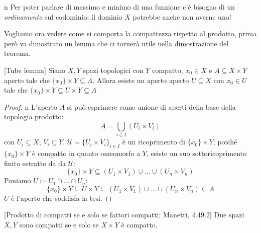 \begin{warning}{n}
	Per poter parlare di massimo e minimo di una funzione c'è bisogno di un \textit{ordinamento} sul codominio; il dominio $X$ potrebbe anche non averne uno!
\end{warning}
Vogliamo ora vedere come si comporta la compattezza rispetto al prodotto, prima però va dimostrato un lemma che ci tornerà utile nella dimostrazione del teorema.
\begin{lemma}{}[Tube lemma]\label{tube lemma}
Siano $X,Y$ spazi topologici con $Y$ compatto, $x_0\in X$ e $A\subseteq X\times Y$ aperto tale che $\{x_0\}\times Y\subseteq A$. Allora esiste un aperto aperto $ U\subseteq X$ con $x_0\in U$ tale che $\{x_0\}\times Y \subseteq U\times Y \subseteq A$
\end{lemma}
\begin{proof}{n}
	L'aperto $A$ si può esprimere come unione di aperti della base della topologia prodotto:
	\begin{equation*}
		A=\bigcup_{i\in I}\left( U_i\times V_i \right)
	\end{equation*}
	con $U_i\subseteq X$, $V_i\subseteq Y$. $\mathcal{U}=\{U_i\times V_i\}_{i\in I}$ è un ricoprimento di $\{x_0\}\times Y$; poiché $\{x_0\}\times Y$ è compatto in quanto omeomorfo a $Y$, esiste un suo sottoricoprimento finito estratto da da $\mathcal{U}$:
	\begin{equation*}
		\{x_0\}\times Y\subseteq (U_1\times V_1)\cup\ldots\cup (U_n\times V_n)
	\end{equation*}
	Poniamo $U\coloneqq U_1\cap\ldots\cap U_n$:
	\begin{equation*}
		\{x_0\}\times Y\subseteq U\times Y \subseteq (U_1\times V_1)	\cup\ldots\cup (U_n\times V_n) \subseteq A
	\end{equation*}
	$U$ è l'aperto che soddisfa la tesi.\qedhere
\end{proof}
\begin{theorem}{}[Prodotto di compatti se e solo se fattori compatti; Manetti, 4.49.2]\label{prodotto compatti}
Due spazi $X,Y$ sono compatti se e solo se $X\times Y$ è compatto.
\end{theorem}
